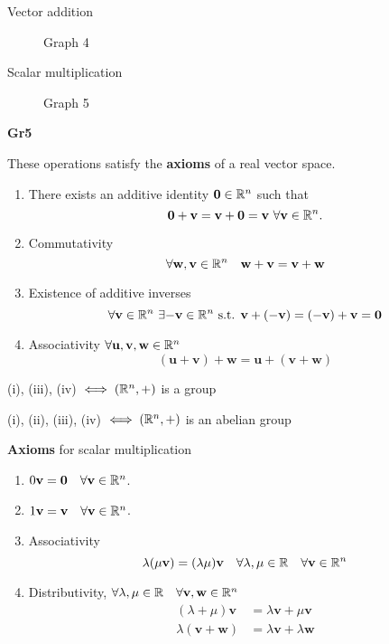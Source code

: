 \documentclass[10pt, a4paper]{article}
\newcommand{\mbf}[1]{\mathbf{#1}}
\begin{document}
Vector addition
\begin{figure}[H]
    \centering
    \caption{Graph 4}
    \label{fig:Gr4}
\end{figure}

Scalar multiplication
\begin{figure}[H]
    \centering
    \caption{Graph 5}
    \label{fig:Gr5}
\end{figure}
\textbf{Gr5}


These operations satisfy the \textbf{axioms} of a real vector space.
\begin{enumerate}[label = (\roman*)]
    \item There exists an additive identity $\mbf{0} \in \R ^ n$ such that
    \[
    \mbf{0 + v = v + 0 = v} \ \forall \mbf{v} \in \R ^ n.
    \]
    \item Commutativity
    \[
    \forall\mbf{w, v} \in \R ^ n\quad\mbf{w + v =  v + w}
    \]
    \item Existence of additive inverses
    \[
    \forall\mbf{v} \in \R ^ n\ \exists\mbf{-v} \in \R ^ n \text{ s.t. } \mbf{v + (-v) = (-v) + v = 0}
    \]
    \item Associativity
    $\forall\mbf{u, v, w} \in \R ^ n$
    \[
    (\mbf{u + v}) + \mbf{w} = \mbf{u} + (\mbf{v + w})
    \]
\end{enumerate}
(i), (iii), (iv) $\iff (\mathbb{R} ^ n, +)$ is a group

(i), (ii), (iii), (iv) $\iff (\mathbb{R} ^ n, +)$ is an abelian group



\textbf{Axioms} for scalar multiplication
\begin{enumerate}[label = (\roman*)]
    \item $0\mbf{v} = \mbf{0}\quad\forall\mbf{v}\in \R ^ n$.
    \item $1\mbf{v} = \mbf{v}\quad\forall\mbf{v}\in \R ^ n$.
    \item Associativity
    \[
    \lambda (\mu\mbf{v}) = (\lambda\mu)\mbf{v}\quad\forall\lambda,\mu \in \R\quad\forall\mbf{v}\in\R ^ n
    \]
    \item Distributivity, $\forall\lambda,\mu\in\R\quad\forall\mbf{v, w} \in \R ^ n$
    \begin{align*}
    (\lambda + \mu)\mbf{v} &= \lambda\mbf{v} + \mu\mbf{v} \\
    \lambda(\mbf{v + w}) &= \lambda\mbf{v} + \lambda\mbf{w}
    \end{align*}
\end{enumerate}
\end{document}
